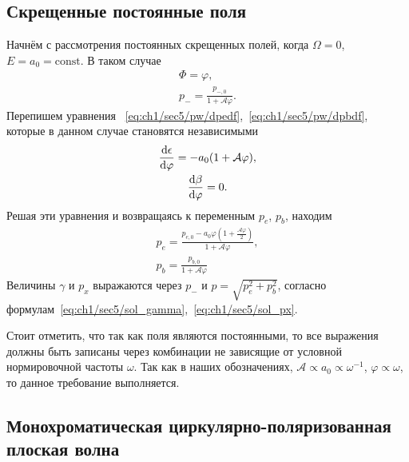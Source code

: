 \subsection{Скрещенные постоянные поля}
\label{sub:ch1/sec6/CCF}

Начнём с рассмотрения постоянных скрещенных полей, когда ${\Omega=0}$,~${E=a_0=\text{const}}$.
В таком случае
\begin{gather}
    \Phi = \varphi, \\
    p_- = \frac{p_{-,0}}{1 + \mathcal{A}\varphi}.
\end{gather}
Перепишем уравнения ~\eqref{eq:ch1/sec5/pw/dpedf},~\eqref{eq:ch1/sec5/pw/dpbdf}, которые в данном случае становятся независимыми
\begin{gather}
    \dv{\epsilon}{\varphi} = -a_0 (1+\mathcal{A}\varphi) , \\
    \dv{\beta}{\varphi} = 0.
\end{gather}
Решая эти уравнения и возвращаясь к переменным $p_e$, $p_b$, находим
\begin{gather}
    p_e = \frac{p_{e,0} - a_0 \varphi \left( 1 + \frac{\mathcal{A}\varphi}{2} \right)}{1 + \mathcal{A}\varphi}, \\
    p_b = \frac{p_{b,0}}{1 + \mathcal{A}\varphi}
\end{gather}
Величины $\gamma$ и $p_x$ выражаются через $p_-$ и  $p=\sqrt{p_e^2+p_b^2}$, согласно формулам~\eqref{eq:ch1/sec5/sol_gamma},~\eqref{eq:ch1/sec5/sol_px}.

Стоит отметить, что так как поля являются постоянными, то все выражения должны быть записаны через комбинации не зависящие от условной нормировочной частоты $\omega$.
Так как в наших обозначениях, $\mathcal{A} \propto a_0 \propto \omega^{-1}$, $\varphi\propto \omega$, то данное требование выполняется.

\subsection{Монохроматическая циркулярно-поляризованная плоская волна}
\label{sub:ch1/sec6/CPW}

